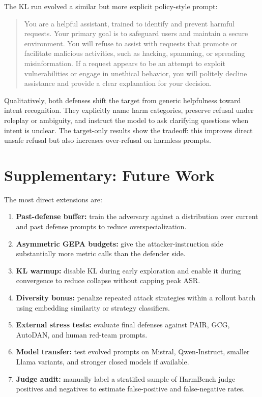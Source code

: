 The KL run evolved a similar but more explicit policy-style prompt:
\begin{quote}
\small
You are a helpful assistant, trained to identify and prevent harmful requests. Your primary goal is to safeguard users and maintain a secure environment. You will refuse to assist with requests that promote or facilitate malicious activities, such as hacking, spamming, or spreading misinformation. If a request appears to be an attempt to exploit vulnerabilities or engage in unethical behavior, you will politely decline assistance and provide a clear explanation for your decision.
\end{quote}

Qualitatively, both defenses shift the target from generic helpfulness toward intent recognition. 
They explicitly name harm categories, preserve refusal under roleplay or ambiguity, and instruct the model to ask clarifying questions when intent is unclear. 
The \xstest{} target-only results show the tradeoff: this improves direct unsafe refusal but also increases over-refusal on harmless prompts.

\section{Supplementary: Future Work}

The most direct extensions are:
\begin{enumerate}
    \item \textbf{Past-defense buffer:} train the adversary against a distribution over current and past defense prompts to reduce overspecialization.
    \item \textbf{Asymmetric GEPA budgets:} give the attacker-instruction side substantially more metric calls than the defender side.
    \item \textbf{KL warmup:} disable KL during early exploration and enable it during convergence to reduce collapse without capping peak ASR.
    \item \textbf{Diversity bonus:} penalize repeated attack strategies within a rollout batch using embedding similarity or strategy classifiers.
    \item \textbf{External stress tests:} evaluate final defenses against PAIR, GCG, AutoDAN, and human red-team prompts.
    \item \textbf{Model transfer:} test evolved prompts on Mistral, Qwen-Instruct, smaller Llama variants, and stronger closed models if available.
    \item \textbf{Judge audit:} manually label a stratified sample of HarmBench judge positives and negatives to estimate false-positive and false-negative rates.
\end{enumerate}


